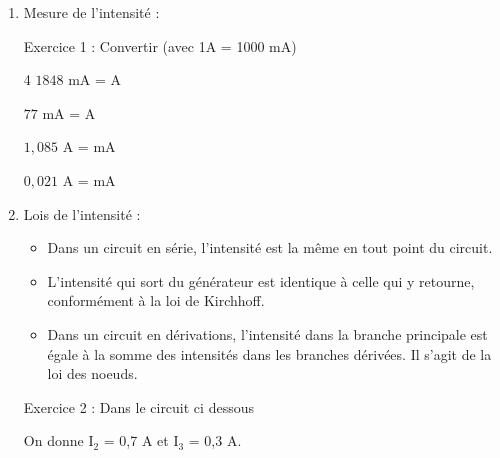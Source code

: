 \documentclass[11pt,a4paper]{article}
\newcommand{\cadreblanc}[1]{%
\medskip\framebox[\linewidth][c]{%
\rule{0mm}{#1mm}}\par
\medskip}
\begin{document}
\begin{enumerate}
    \item Mesure de l'intensité :

\cadreblanc{30}



Exercice 1 : Convertir (avec 1A = 1000 mA)  ~~ 


\vspace{1mm}

\begin{multicols}{4}
$1848$ mA = \dotfill A 
\vspace{5mm}

$77$ mA = \dotfill A 
\vspace{5mm}


$1,085$ A = \dotfill mA
\vspace{5mm}


$0,021$ A = \dotfill mA
\vspace{5mm}
    
\end{multicols}

\cadreblanc{25}
    \vfill

\item Lois de l'intensité : \\[-2mm]
    \vspace{-2mm}
    \begin{itemize}
        \item Dans un circuit en série, l'intensité est la même en tout point du circuit. 
        \item L'intensité qui sort du générateur est identique à celle qui y retourne, conformément à la loi de Kirchhoff.
        \item Dans un circuit en dérivations, l'intensité dans la branche principale est égale à la somme des intensités dans les branches dérivées. Il s'agit de la loi des noeuds. 
    \end{itemize}
    \vspace{-3mm}
    
    \begin{center}
    
        \begin{minipage}{7cm}
        \cadreblanc{10}
        \end{minipage}
        
    \end{center}

    
    Exercice 2 :
    Dans le circuit ci dessous \\
    \vspace{-5mm}
\noindent%
\begin{minipage}{.65\textwidth}%
 On donne $\mathrm{I_2 }$ = 0,7 A et $\mathrm{I_3 }$ = 0,3 A.
 

\end{minipage}
\end{enumerate}
\end{document}
